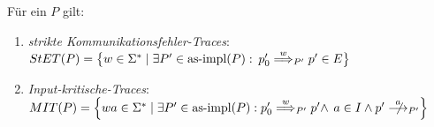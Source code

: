 \begin{Prop}
  \label{KommTracesProp}
  Für ein \MEIO{} $P$ gilt:
  \begin{enumerate}
    \item \emph{strikte Kommunikationsfehler-Traces}: $StET (P) =
      \big\{w\in\Sigma ^* \mid \exists P' \in\mathrm{as}\text{-}\mathrm{impl} (P) :$ $p'_0
      \weakmust[w]_{P'} p' \in E\big\}$ 
    \item \emph{Input-kritische-Traces}: $\MIT (P) = \left\{wa\in\Sigma ^* \mid
      \exists P' \in\asimp (P) : p'_0 \weakmust[w]_{P'} p' \land
      \right.$\linebreak $\left. a\in I\land p'\nmust[a]_{P'} \right\}$ 
  \end{enumerate}
\end{Prop}
